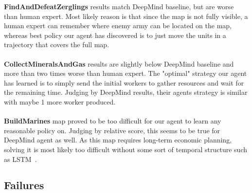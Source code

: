 \textbf{FindAndDefeatZerglings} results match DeepMind baseline, but are worse than human expert. Most likely reason is that since the map is not fully visible, a human expert can remember where enemy army can be located on the map, whereas best policy our agent has discovered is to just move the units in a trajectory that covers the full map.
\\\\
\textbf{CollectMineralsAndGas} results are slightly below DeepMind baseline and more than two times worse than human expert. The "optimal" strategy our agent has learned is to simply send the initial workers to gather resources and wait for the remaining time. Judging by DeepMind results, their agents strategy is similar with maybe 1 more worker produced.
\\\\
\textbf{BuildMarines} map proved to be too difficult for our agent to learn any reasonable policy on. Judging by relative score, this seems to be true for DeepMind agent as well. As this map requires long-term economic planning, solving it is most likely too difficult without some sort of temporal structure such as LSTM~\cite{Hochreiter1997}.

\subsection{Failures}

